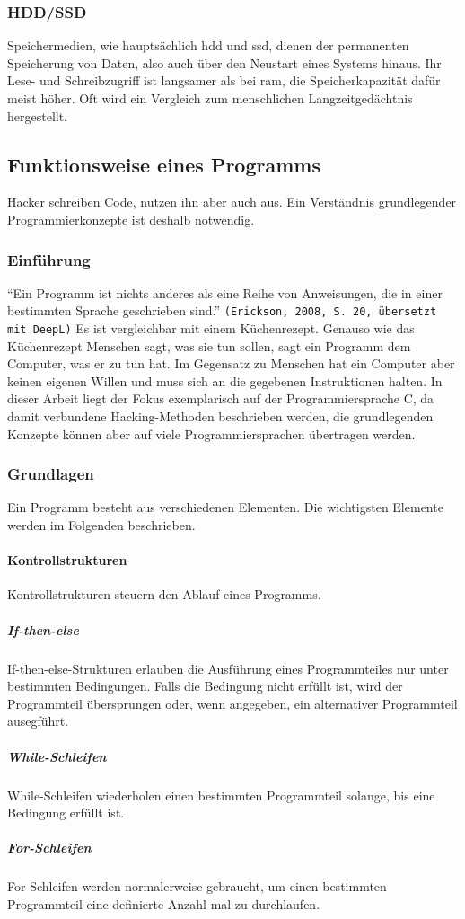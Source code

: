 \documentclass[11pt, a4paper]{article}
\begin{document}
\subsubsection{HDD/SSD}
Speichermedien, wie hauptsächlich \gls{hdd} und \gls{ssd}, dienen der permanenten Speicherung von Daten, also auch über den Neustart eines Systems hinaus. Ihr Lese- und Schreibzugriff ist langsamer als bei \gls{ram}, die Speicherkapazität dafür meist höher. Oft wird ein Vergleich zum menschlichen Langzeitgedächtnis hergestellt. 

\subsection{Funktionsweise eines Programms}\label{subsec:funktionsweise-eines-programmes}
Hacker schreiben Code, nutzen ihn aber auch aus. Ein Verständnis grundlegender Programmierkonzepte ist deshalb notwendig.
\subsubsection{Einführung}
``Ein Programm ist nichts anderes als eine Reihe von Anweisungen, die in einer bestimmten Sprache geschrieben sind.'' \texttt{(Erickson, 2008, S. 20, übersetzt mit DeepL)} \cite{erickson2008hacking} Es ist vergleichbar mit einem Küchenrezept. Genauso wie das Küchenrezept Menschen sagt, was sie tun sollen, sagt ein Programm dem Computer, was er zu tun hat. Im Gegensatz zu Menschen hat ein Computer aber keinen eigenen Willen und muss sich an die gegebenen Instruktionen halten. In dieser Arbeit liegt der Fokus exemplarisch auf der Programmiersprache C, da damit verbundene Hacking-Methoden beschrieben werden, die grundlegenden Konzepte können aber auf viele Programmiersprachen übertragen werden.
\subsubsection{Grundlagen}
Ein Programm besteht aus verschiedenen Elementen. Die wichtigsten Elemente werden im Folgenden beschrieben.

\paragraph{Kontrollstrukturen}
Kontrollstrukturen steuern den Ablauf eines Programms.
\subparagraph{If-then-else}
If-then-else-Strukturen erlauben die Ausführung eines Programmteiles nur unter bestimmten Bedingungen. Falls die Bedingung nicht erfüllt ist, wird der Programmteil übersprungen oder, wenn angegeben, ein alternativer Programmteil ausegführt.
\subparagraph{While-Schleifen}
While-Schleifen wiederholen einen bestimmten Programmteil solange, bis eine Bedingung erfüllt ist. 
\subparagraph{For-Schleifen}
For-Schleifen werden normalerweise gebraucht, um einen bestimmten Programmteil eine definierte Anzahl mal zu durchlaufen.
\end{document}
